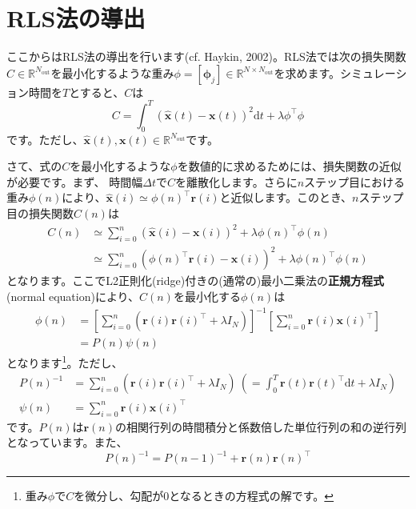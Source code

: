 \section{RLS法の導出}
ここからはRLS法の導出を行います(cf. Haykin, 2002)。RLS法では次の損失関数$C\in \mathbb{R}^{N_\text{out}}$を最小化するような重み$\phi=[\boldsymbol{\phi}_j]\in \mathbb{R}^{N\times N_\text{out}}$を求めます。シミュレーション時間を$T$とすると、$C$は
\begin{equation}
C=\int_{0}^T(\hat{\boldsymbol{x}}(t)-\boldsymbol{x}(t))^{2} \mathrm{d} t+\lambda \phi^\intercal \phi
\end{equation}
です。ただし、$\hat{\boldsymbol{x}}(t), \boldsymbol{x}(t) \in \mathbb{R}^{N_\text{out}}$です。\par
さて、式の$C$を最小化するような$\phi$を数値的に求めるためには、損失関数の近似が必要です。まず、
時間幅$\Delta t$で$C$を離散化します。さらに$n$ステップ目における重み$\phi(n)$により、$\hat{\boldsymbol{x}}(i)\simeq \phi(n)^\intercal \boldsymbol{r}(i)$と近似します。このとき、$n$ステップ目の損失関数$C(n)$は
\begin{align}
C(n)&\simeq \sum_{i=0}^{n}(\hat{\boldsymbol{x}}(i)-\boldsymbol{x}(i))^{2}+\lambda \phi(n)^\intercal \phi(n)\\     
&\simeq \sum_{i=0}^{n}(\phi(n)^\intercal \boldsymbol{r}(i)-\boldsymbol{x}(i))^{2}+\lambda \phi(n)^\intercal \phi(n)
\end{align}
となります。ここでL2正則化(ridge)付きの(通常の)最小二乗法の\textbf{正規方程式}(normal equation)により、$C(n)$を最小化する$\phi(n)$は
\begin{align}
\phi(n) &= \left[\sum_{i=0}^{n}(\boldsymbol{r}(i)\boldsymbol{r}(i)^\intercal+\lambda I_N)\right]^{-1}\left[\sum_{i=0}^{n}\boldsymbol{r}(i)\boldsymbol{x}(i)^\intercal\right]\\
&=P(n)\psi(n)
\end{align}
となります\footnote{重み$\phi$で$C$を微分し、勾配が0となるときの方程式の解です。}。ただし、
\begin{align}
P(n)^{-1}&= \sum_{i=0}^{n}(\boldsymbol{r}(i)\boldsymbol{r}(i)^\intercal+\lambda I_N)\ \left(=\int_{0}^T \boldsymbol{r}(t) \boldsymbol{r}(t)^\intercal \mathrm{d} t+\lambda I_{N}\right)\\
\psi(n)&=\sum_{i=0}^{n}\boldsymbol{r}(i)\boldsymbol{x}(i)^\intercal
\end{align}
です。$P(n)$は$\boldsymbol{r}(n)$の相関行列の時間積分と係数倍した単位行列の和の逆行列となっています。また、
\begin{equation}
P(n)^{-1}=P(n-1)^{-1}+\boldsymbol{r}(n) \boldsymbol{r}(n)^\intercal
\end{equation}

